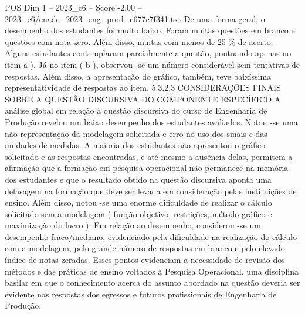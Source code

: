 \begin{textsample}{POS Dim 1 – 2023\_c6 – Score -2.00 – 2023\_c6/enade\_2023\_eng\_prod\_c677c7f341.txt}
De uma forma geral, o desempenho dos estudantes foi muito baixo.
Foram muitas questões em branco e questões com nota zero.
Além disso, muitas com menos de 25 \% de acerto.
Alguns estudantes contemplaram parcialmente a questão, pontuando apenas no item a ).
Já no item ( b ), observou -se um número considerável sem tentativas de respostas.
Além disso, a apresentação do gráfico, também, teve baixíssima representatividade de respostas ao item. 5.3.2.3 CONSIDERAÇÕES FINAIS SOBRE A QUESTÃO DISCURSIVA DO COMPONENTE ESPECÍFICO A análise global em relação à questão discursiva do curso de Engenharia de Produção revelou um baixo desempenho dos estudantes avaliados.
Notou -se uma não representação da modelagem solicitada e erro no uso dos sinais e das unidades de medidas.
A maioria dos estudantes não apresentou o gráfico solicitado e as respostas encontradas, e até mesmo a ausência delas, permitem a afirmação que a formação em pesquisa operacional não permanece na memória dos estudantes e que o resultado obtido na questão discursiva aponta uma defasagem na formação que deve ser levada em consideração pelas instituições de ensino.
Além disso, notou -se uma enorme dificuldade de realizar o cálculo solicitado sem a modelagem ( função objetivo, restrições, método gráfico e maximização do lucro ).
Em relação ao desempenho, considerou -se um desempenho fraco/mediano, evidenciado pela dificuldade na realização do cálculo com a modelagem, pelo grande número de respostas em branco e pelo elevado índice de notas zeradas.
Esses pontos evidenciam a necessidade de revisão dos métodos e das práticas de ensino voltados à Pesquisa Operacional, uma disciplina basilar em que o conhecimento acerca do assunto abordado na questão deveria ser evidente nas respostas dos egressos e futuros profissionais de Engenharia de Produção.

\end{textsample}
